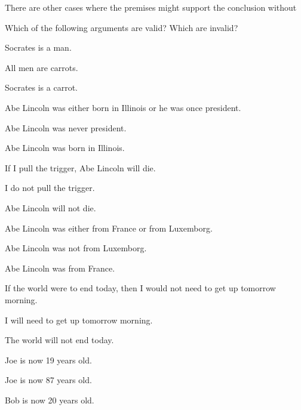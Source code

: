 There are other cases where the premises might support the conclusion without 








\practiceproblems
\problempart
Which of the following arguments are valid? Which are invalid?

\begin{earg}
\item Socrates is a man.
\item All men are carrots.
\item[\therefore] Socrates is a carrot.
\end{earg}

\begin{earg}
\item Abe Lincoln was either born in Illinois or he was once president.
\item Abe Lincoln was never president.
\item[\therefore] Abe Lincoln was born in Illinois.
\end{earg}

\begin{earg}
\item If I pull the trigger, Abe Lincoln will die.
\item I do not pull the trigger.
\item[\therefore] Abe Lincoln will not die.
\end{earg}

\begin{earg}
\item Abe Lincoln was either from France or from Luxemborg.
\item Abe Lincoln was not from Luxemborg.
\item[\therefore] Abe Lincoln was from France.
\end{earg}

\begin{earg}
\item If the world were to end today, then I would not need to get up tomorrow morning.
\item I will need to get up tomorrow morning.
\item[\therefore] The world will not end today.
\end{earg}

\begin{earg}
\item Joe is now 19 years old.
\item Joe is now 87 years old.
\item[\therefore] Bob is now 20 years old.
\end{earg}


